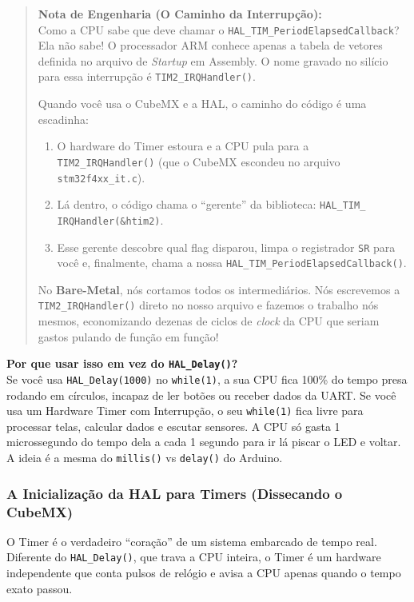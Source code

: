 \documentclass[12pt,a4paper]{article}
\begin{document}
\begin{quote}
\textbf{Nota de Engenharia (O Caminho da Interrupção):} \\
Como a CPU sabe que deve chamar o \texttt{HAL\_TIM\_PeriodElapsedCallback}? Ela não sabe! O processador ARM conhece apenas a tabela de vetores definida no arquivo de \textit{Startup} em Assembly. O nome gravado no silício para essa interrupção é \texttt{TIM2\_IRQHandler()}. 

Quando você usa o CubeMX e a HAL, o caminho do código é uma escadinha:
\begin{enumerate}
    \item O hardware do Timer estoura e a CPU pula para a \texttt{TIM2\_IRQHandler()} (que o CubeMX escondeu no arquivo \texttt{stm32f4xx\_it.c}).
    \item Lá dentro, o código chama o ``gerente'' da biblioteca: \texttt{HAL\_TIM\_\\IRQHandler(\&htim2)}.
    \item Esse gerente descobre qual flag disparou, limpa o registrador \texttt{SR} para você e, finalmente, chama a nossa \texttt{HAL\_TIM\_PeriodElapsedCallback()}.
\end{enumerate}

No \textbf{Bare-Metal}, nós cortamos todos os intermediários. Nós escrevemos a \texttt{TIM2\_IRQHandler()} direto no nosso arquivo e fazemos o trabalho nós mesmos, economizando dezenas de ciclos de \textit{clock} da CPU que seriam gastos pulando de função em função!
\end{quote}

\textbf{Por que usar isso em vez do \texttt{HAL\_Delay()}?}\\
Se você usa \texttt{HAL\_Delay(1000)} no \texttt{while(1)}, a sua CPU fica 100\% do tempo presa rodando em círculos, incapaz de ler botões ou receber dados da UART.
Se você usa um Hardware Timer com Interrupção, o seu \texttt{while(1)} fica livre para processar telas, calcular dados e escutar sensores. A CPU só gasta 1 microssegundo do tempo dela a cada 1 segundo para ir lá piscar o LED e voltar. A ideia é a mesma do \texttt{millis()} vs \texttt{delay()} do Arduino.

\subsubsection{A Inicialização da HAL para Timers (Dissecando o CubeMX)}

O Timer é o verdadeiro ``coração'' de um sistema embarcado de tempo real. Diferente do \texttt{HAL\_Delay()}, que trava a CPU inteira, o Timer é um hardware independente que conta pulsos de relógio e avisa a CPU apenas quando o tempo exato passou.
\end{document}
